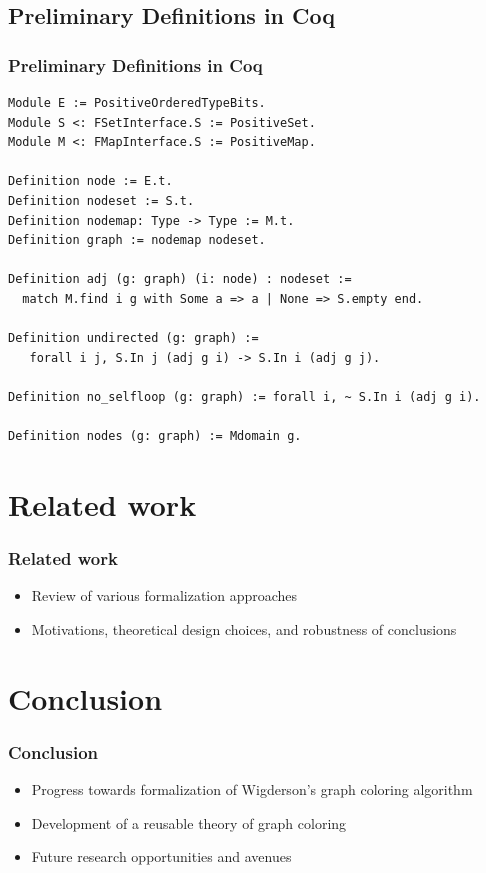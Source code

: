 \documentclass{beamer}
\begin{document}
\subsection{Preliminary Definitions in Coq}
\begin{frame}[fragile]
\frametitle{Preliminary Definitions in Coq}
\begin{verbatim}
Module E := PositiveOrderedTypeBits.
Module S <: FSetInterface.S := PositiveSet.
Module M <: FMapInterface.S := PositiveMap.

Definition node := E.t.
Definition nodeset := S.t.
Definition nodemap: Type -> Type := M.t.
Definition graph := nodemap nodeset.

Definition adj (g: graph) (i: node) : nodeset :=
  match M.find i g with Some a => a | None => S.empty end.

Definition undirected (g: graph) :=
   forall i j, S.In j (adj g i) -> S.In i (adj g j).

Definition no_selfloop (g: graph) := forall i, ~ S.In i (adj g i).

Definition nodes (g: graph) := Mdomain g.
\end{verbatim}
\end{frame}

\section{Related work}
\begin{frame}
\frametitle{Related work}
\begin{itemize}
\item Review of various formalization approaches
\item Motivations, theoretical design choices, and robustness of conclusions
\end{itemize}
\end{frame}

\section{Conclusion}
\begin{frame}
\frametitle{Conclusion}
\begin{itemize}
\item Progress towards formalization of Wigderson's graph coloring algorithm
\item Development of a reusable theory of graph coloring
\item Future research opportunities and avenues
\end{itemize}
\end{frame}
\end{document}
